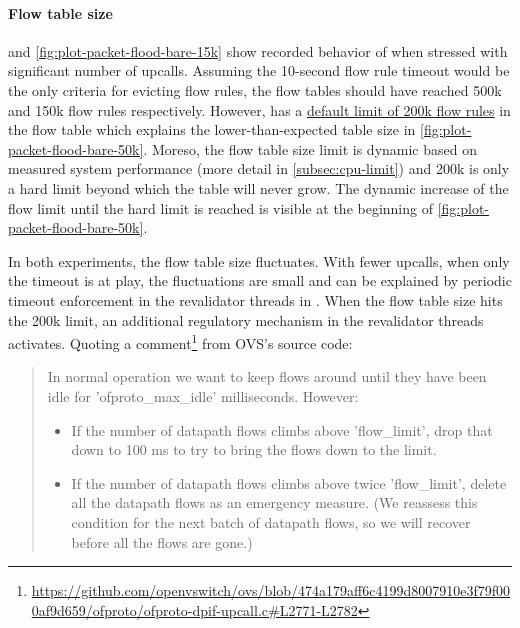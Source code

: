 \paragraph{Flow table size}
 and \cref{fig:plot-packet-flood-bare-15k} show recorded behavior of  when stressed with significant number of upcalls. Assuming the 10-second flow rule timeout would be the only criteria for evicting flow rules, the flow tables should have reached 500k and 150k flow rules respectively. However,  has a \href{https://github.com/openvswitch/ovs/blob/859071224c590207ca5e1f8723ffdef72ef7b512/ofproto/ofproto.h\#L310}{default limit of 200k flow rules} in the flow table which explains the lower-than-expected table size in \cref{fig:plot-packet-flood-bare-50k}. Moreso, the flow table size limit is dynamic based on measured system performance (more detail in \cref{subsec:cpu-limit}) and 200k is only a hard limit beyond which the table will never grow. The dynamic increase of the flow limit until the hard limit is reached is visible at the beginning of \cref{fig:plot-packet-flood-bare-50k}.

In both experiments, the flow table size fluctuates. With fewer upcalls, when only the timeout is at play, the fluctuations are small and can be explained by periodic timeout enforcement in the revalidator threads in . When the flow table size hits the 200k limit, an additional regulatory mechanism in the revalidator threads activates. Quoting a comment\footnote{\url{https://github.com/openvswitch/ovs/blob/474a179aff6c4199d8007910e3f79f000af9d659/ofproto/ofproto-dpif-upcall.c\#L2771-L2782}} from OVS's source code:

\begin{quote}
    In normal operation we want to keep flows around until they have
    been idle for 'ofproto\_max\_idle' milliseconds.  However:

    \begin{itemize}
        \item If the number of datapath flows climbs above 'flow\_limit', drop that down to 100 ms to try to bring the flows down to the limit.

        \item If the number of datapath flows climbs above twice 'flow\_limit', delete all the datapath flows as an emergency measure.  (We reassess this condition for the next batch of datapath flows, so we will recover before all the flows are gone.)
    \end{itemize}
\end{quote}

